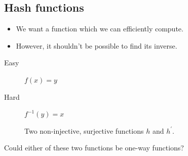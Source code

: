 \subsection{Hash functions}

\begin{frame}
  \begin{idea}
    \begin{itemize}
      \item We want a function which we can efficiently compute.

        \pause{}

      \item However, it shouldn't be possible to find its inverse.
    \end{itemize}
  \end{idea}

  \pause{}

  \begin{example}
    \begin{description}
      \item[Easy] \(f(x) = y\)
      \item[Hard] \(f^{-1}(y) = x\)
    \end{description}
  \end{example}
\end{frame}

\begin{frame}
  \begin{figure}
    \hspace{0.1\textwidth}
    \caption{%
      Two non-injective, surjective functions \(h\) and \(h^\prime\).
    }
  \end{figure}

  \begin{exercise}
    Could either of these two functions be one-way functions?
  \end{exercise}
\end{frame}

